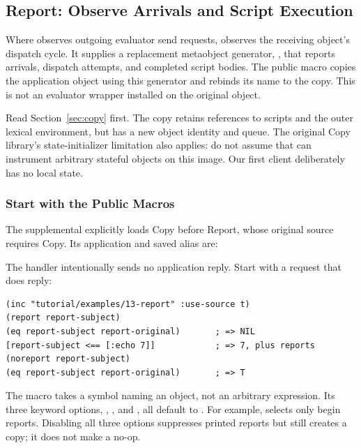 \subsection{Report: Observe Arrivals and Script Execution}
\label{sec:report}

Where  observes outgoing evaluator send requests,
 observes the receiving object's dispatch
cycle. It supplies a replacement metaobject generator,
, that reports arrivals, dispatch attempts, and
completed script bodies. The public  macro copies the
application object using this generator and rebinds its name to the copy.
This is not an evaluator wrapper installed on the original object.

Read Section~\ref{sec:copy} first. The copy retains references to scripts
and the outer lexical environment, but has a new object identity and queue.
The original Copy library's state-initializer limitation also applies:
do not assume that  can instrument arbitrary stateful
objects on this image. Our first client deliberately has no local state.

\subsubsection{Start with the Public Macros}

The supplemental  explicitly
loads Copy before Report, whose original source requires Copy. Its
application and saved alias are:


The  handler intentionally sends no application reply.
Start with a request that does reply:

\begin{codeblock}
\begin{lstlisting}
(inc "tutorial/examples/13-report" :use-source t)
(report report-subject)
(eq report-subject report-original)       ; => NIL
[report-subject <== [:echo 7]]            ; => 7, plus reports
(noreport report-subject)
(eq report-subject report-original)       ; => T
\end{lstlisting}
\end{codeblock}

The macro takes a symbol naming an object, not an arbitrary expression.
Its three keyword options, , , and
, all default to . For example,
 selects only begin
reports. Disabling all three options suppresses printed reports but
still creates a copy; it does not make  a no-op.

